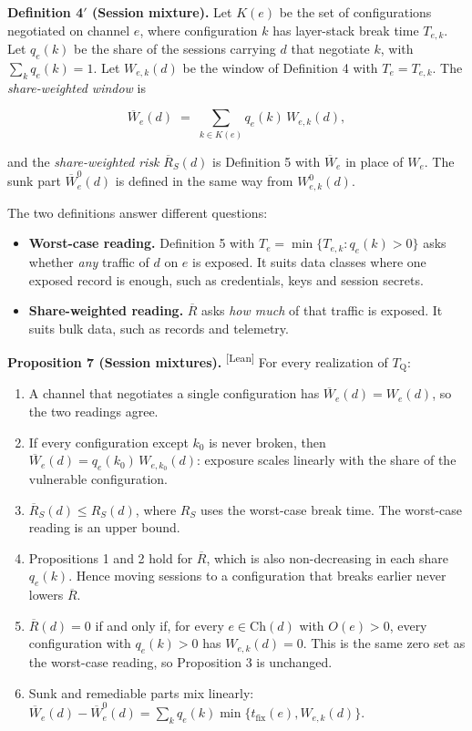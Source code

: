 \documentclass[conference]{IEEEtran}
\newcommand{\Tq}{T_{\mathrm{Q}}}
\newcommand{\tfix}{t_{\mathrm{fix}}}
\newcommand{\Ch}{\mathrm{Ch}}
\providecommand{\gt}{}\renewcommand{\gt}{>}
\newcommand{\leantag}{\textsuperscript{\textsf{\scriptsize[Lean]}}}
\newenvironment{envblock}{\par\smallskip\noindent\ignorespaces}{\par\smallskip}
\begin{document}
\begin{envblock}

\textbf{Definition 4$'$ (Session mixture).} Let $K(e)$ be the set of configurations negotiated on channel $e$, where configuration $k$ has layer-stack break time $T_{e,k}$. Let $q_e(k)$ be the share of the sessions carrying $d$ that negotiate $k$, with $\sum_k q_e(k) = 1$. Let $W_{e,k}(d)$ be the window of Definition 4 with $T_e = T_{e,k}$. The \emph{share-weighted window} is

\[ \overline{W}_e(d) \;=\; \sum_{k \in K(e)} q_e(k)\, W_{e,k}(d), \]

and the \emph{share-weighted risk} $\overline{R}_S(d)$ is Definition 5 with $\overline{W}_e$ in place of $W_e$. The sunk part $\overline{W}^0_e(d)$ is defined in the same way from $W^0_{e,k}(d)$.
\end{envblock}

The two definitions answer different questions:

\begin{itemize}
\item \textbf{Worst-case reading.} Definition 5 with $T_e = \min\{T_{e,k} : q_e(k) \gt 0\}$ asks whether \emph{any} traffic of $d$ on $e$ is exposed. It suits data classes where one exposed record is enough, such as credentials, keys and session secrets.
\item \textbf{Share-weighted reading.} $\overline{R}$ asks \emph{how much} of that traffic is exposed. It suits bulk data, such as records and telemetry.
\end{itemize}

\begin{envblock}

\textbf{Proposition 7 (Session mixtures).} \leantag{} For every realization of $\Tq$:

\begin{enumerate}[label=(\alph*)]
\item A channel that negotiates a single configuration has $\overline{W}_e(d) = W_e(d)$, so the two readings agree.
\item If every configuration except $k_0$ is never broken, then $\overline{W}_e(d) = q_e(k_0)\, W_{e,k_0}(d)$: exposure scales linearly with the share of the vulnerable configuration.
\item $\overline{R}_S(d) \le R_S(d)$, where $R_S$ uses the worst-case break time. The worst-case reading is an upper bound.
\item Propositions 1 and 2 hold for $\overline{R}$, which is also non-decreasing in each share $q_e(k)$. Hence moving sessions to a configuration that breaks earlier never lowers $\overline{R}$.
\item $\overline{R}(d) = 0$ if and only if, for every $e \in \Ch(d)$ with $O(e) \gt 0$, every configuration with $q_e(k) \gt 0$ has $W_{e,k}(d) = 0$. This is the same zero set as the worst-case reading, so Proposition 3 is unchanged.
\item Sunk and remediable parts mix linearly: $\overline{W}_e(d) - \overline{W}^0_e(d) = \sum_k q_e(k) \min\{\tfix(e), W_{e,k}(d)\}$.
\end{enumerate}
\end{envblock}
\end{document}
